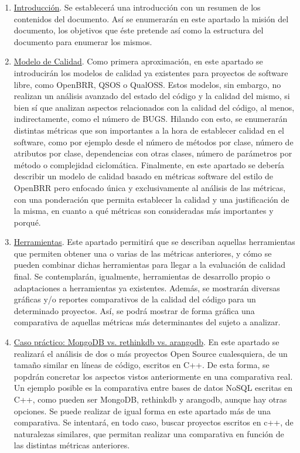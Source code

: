 \documentclass[11pt]{article}
\begin{document}
\begin{enumerate}
\item{\underline{Introducción}}. Se establecerá una introducción con un resumen de los contenidos del documento. Así se enumerarán en este apartado la misión del documento, los objetivos que éste pretende así como la estructura del documento para enumerar los mismos.
\item{\underline{Modelo de Calidad}}. Como primera aproximación, en este apartado se introducirán los modelos de calidad ya existentes para proyectos de software libre, como OpenBRR, QSOS o QualOSS. Estos modelos, sin embargo, no realizan un análisis avanzado del estado del código y la calidad del mismo, si bien sí que analizan aspectos relacionados con la calidad del código, al menos, indirectamente, como el número de BUGS.
Hilando con esto, se enumerarán distintas métricas que son importantes a la hora de establecer calidad en el software, como por ejemplo desde el número de métodos por clase, número de atributos por clase, dependencias con otras clases, número de parámetros por método o complejidad ciclomática.
Finalmente, en este apartado se debería describir un modelo de calidad basado en métricas software del estilo de OpenBRR pero enfocado única y exclusivamente al análisis de las métricas, con una ponderación que permita establecer la calidad y una justificación de la misma, en cuanto a qué métricas son consideradas más importantes y porqué.
\item{\underline{Herramientas}}. Este apartado permitirá que se describan aquellas herramientas que permiten obtener una o varias de las métricas anteriores, y cómo se pueden combinar dichas herramientas para llegar a la evaluación de calidad final. Se contemplarán, igualmente, herramientas de desarrollo propio o adaptaciones a herramientas ya existentes. Además, se mostrarán diversas gráficas y/o reportes comparativos de la calidad del código para un determinado proyectos.
Así, se podrá mostrar de forma gráfica una comparativa de aquellas métricas más determinantes del sujeto a analizar.
\item{\underline{Caso práctico: MongoDB vs. rethinkdb vs. arangodb}}. En este apartado se realizará el análisis de dos o más proyectos Open Source cualesquiera, de un tamaño similar en líneas de código, escritos en C++. De esta forma, se popdrán concretar los aspectos vistos anteriormente en una comparativa real.
Un ejemplo posible es la comparativa entre bases de datos NoSQL escritas en C++, como pueden ser MongoDB, rethinkdb y arangodb, aunque hay otras opciones. Se puede realizar de igual forma en este apartado más de una comparativa. Se intentará, en todo caso, buscar proyectos escritos en c++, de naturalezas similares, que permitan realizar una comparativa en función de las distintas métricas anteriores.

\end{enumerate}
\end{document}
